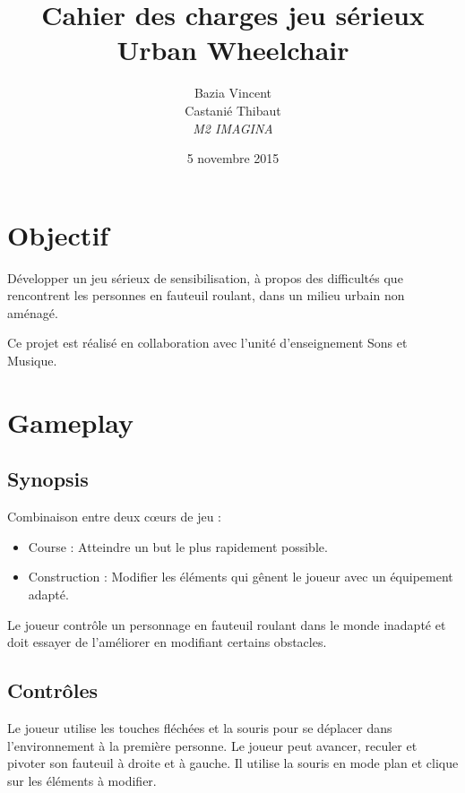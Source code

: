 \documentclass[a4paper,11pt]{article}
\begin{document}
\author{Bazia Vincent\\Castanié Thibaut\\\textit{M2 IMAGINA}}
\title{\textbf{Cahier des charges jeu sérieux}\\Urban Wheelchair}
\date{5 novembre 2015}

\maketitle

\newpage

\tableofcontents

\newpage

\section{Objectif}

Développer un jeu sérieux de sensibilisation, à propos des difficultés que rencontrent les personnes en fauteuil roulant, dans un milieu urbain non aménagé.

Ce projet est réalisé en collaboration avec l’unité d’enseignement Sons et Musique.


\section{Gameplay}

\subsection{Synopsis}

Combinaison entre deux cœurs de jeu :
\begin{itemize}
\item Course : Atteindre un but le plus rapidement possible.
\item Construction : Modifier les éléments qui gênent le joueur avec un équipement adapté. 
\end{itemize}

Le joueur contrôle un personnage en fauteuil roulant dans le monde inadapté et doit essayer de l’améliorer en modifiant certains obstacles.

\subsection{Contrôles}

Le joueur utilise les touches fléchées et la souris pour se déplacer dans l’environnement à la première personne. Le joueur peut avancer, reculer et pivoter son fauteuil à droite et à gauche.
Il utilise la souris en mode plan et clique sur les éléments à modifier.
\end{document}
